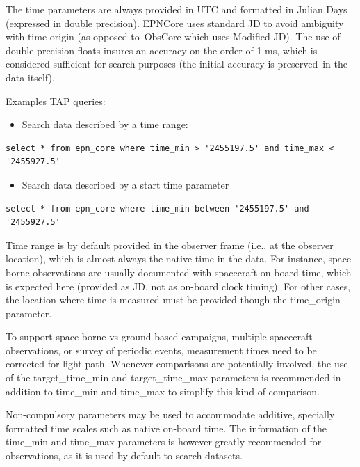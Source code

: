 \documentclass[11pt,a4paper]{ivoa}
\begin{document}
The time parameters are always provided in UTC and formatted in Julian Days (expressed in double precision). EPNCore uses standard JD to avoid ambiguity with time origin (as opposed to ObsCore which uses Modified JD). The use of double precision floats insures an accuracy on the order of 1 ms, which is considered sufficient for search purposes (the initial accuracy is preserved in the data itself).

Examples TAP queries:

\begin{itemize}
\item Search data described by a time range:
\end{itemize}






\begin{verbatim}
select * from epn_core where time_min > '2455197.5' and time_max < '2455927.5'
\end{verbatim}




\begin{itemize}
\item Search data described by a start time parameter
\end{itemize}






\begin{verbatim}
select * from epn_core where time_min between '2455197.5' and '2455927.5'
\end{verbatim}




Time range is by default provided in the observer frame (i.e., at the observer location), which is almost always the native time in the data. For instance, space-borne observations are usually documented with spacecraft on-board time, which is expected here (provided as JD, not as on-board clock timing). For other cases, the location where time is measured must be provided though the time\_origin parameter.

To support space-borne vs ground-based campaigns, multiple spacecraft observations, or survey of periodic events, measurement times need to be corrected for light path. Whenever comparisons are potentially involved, the use of the target\_time\_min and target\_time\_max parameters is recommended in addition to time\_min and time\_max to simplify this kind of comparison.

Non-compulsory parameters may be used to accommodate additive, specially formatted time scales such as native on-board time. The information of the time\_min and time\_max parameters is however greatly recommended for observations, as it is used by default to search datasets.
\end{document}
